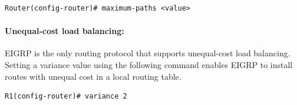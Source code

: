 \begin{verbatim}
Router(config-router)# maximum-paths <value>
\end{verbatim} 

\paragraph{Unequal-cost load balancing:} EIGRP is the only routing protocol that supports unequal-cost load balancing. Setting a variance value using the following command enables EIGRP to install routes with unequal cost in a local routing table. 

\begin{verbatim}
R1(config-router)# variance 2
\end{verbatim}

